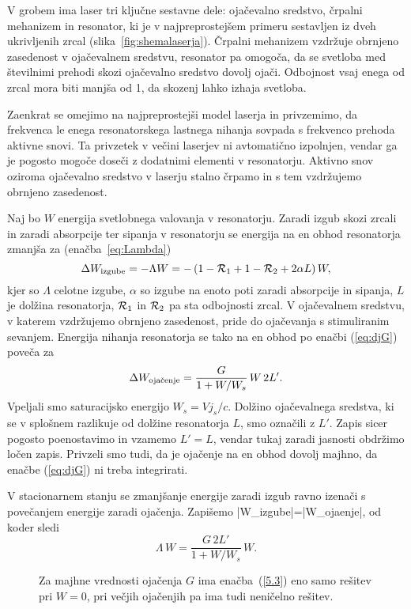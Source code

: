 V grobem ima laser tri ključne sestavne dele: ojačevalno sredstvo, 
črpalni mehanizem in resonator, ki je v najpreprostejšem primeru sestavljen iz dveh 
ukrivljenih zrcal (slika~\ref{fig:shemalaserja}). Črpalni 
mehanizem vzdržuje obrnjeno zasedenost v ojačevalnem sredstvu, resonator pa omogoča,
da se svetloba med številnimi prehodi skozi ojačevalno sredstvo dovolj ojači.
Odbojnost vsaj enega od zrcal 
mora biti manjša od 1, da skozenj lahko izhaja svetloba.

Zaenkrat se omejimo na najpreprostejši model laserja in 
privzemimo, da frekvenca le enega resonatorskega lastnega nihanja sovpada s 
frekvenco prehoda aktivne snovi. Ta privzetek v večini laserjev ni
avtomatično izpolnjen, vendar ga je pogosto mogoče doseči z dodatnimi elementi 
v resonatorju. Aktivno snov oziroma ojačevalno sredstvo v laserju stalno 
črpamo in s tem vzdržujemo obrnjeno zasedenost. 

Naj bo $W$ energija svetlobnega valovanja v resonatorju. Zaradi izgub skozi
zrcali in zaradi absorpcije ter sipanja v resonatorju se energija na en obhod 
resonatorja zmanjša za (enačba~\ref{eq:Lambda})
\begin{equation}
\Delta W_{\rm izgube}=-\Lambda W=-\left(1-{\cal {R}}_{1}+1-{\cal {R}}_{2}
+2\alpha L\right)W,
\label{5.1}
\end{equation}
kjer so $\Lambda $ celotne izgube, $\alpha$ so izgube na enoto poti zaradi
absorpcije in sipanja, $L$ je dolžina resonatorja, 
${\cal {R}}_{1}$ in ${\cal {R}}_{2}$ pa sta odbojnosti
zrcal. V ojačevalnem sredstvu, v katerem vzdržujemo obrnjeno zasedenost,
pride do ojačevanja s stimuliranim sevanjem. Energija nihanja resonatorja 
se tako na en obhod po enačbi (\ref{eq:djG}) poveča za 
\begin{equation}  
\Delta W_{\rm oja\check{c}enje}=\frac{G}{1+W/W_s}\,W\, 2L'.
\label{5.2}
\end{equation}
Vpeljali smo saturacijsko energijo $W_s=Vj_s/c$. Dolžino ojačevalnega sredstva,
ki se v splošnem razlikuje od dolžine resonatorja $L$, smo označili z $L'$.
Zapis sicer pogosto poenostavimo in vzamemo $L'=L$, vendar tukaj zaradi
jasnosti obdržimo ločen zapis. Privzeli smo tudi, da je ojačenje na en
obhod dovolj majhno, da enačbe (\ref{eq:djG}) ni treba integrirati.

V stacionarnem stanju se zmanjšanje energije zaradi izgub ravno izenači 
s povečanjem energije zaradi ojačenja. Zapišemo
\beq
|\Delta W_{\rm izgube}|=|\Delta W_{\rm ojaenje}|,
\eeq
od koder sledi
\begin{equation}  
\Lambda\, W=\frac{G\,2L'}{1+W/W_s}\,W.
\label{5.3}
\end{equation}
\begin{figure}[h]
\centering
\def\svgwidth{140truemm} 

\caption{Za majhne vrednosti ojačenja $G$ ima enačba~(\ref{5.3}) eno samo 
rešitev pri $W=0$, pri večjih ojačenjih pa ima tudi neničelno rešitev.}
\label{fig:stacio}
\end{figure}

